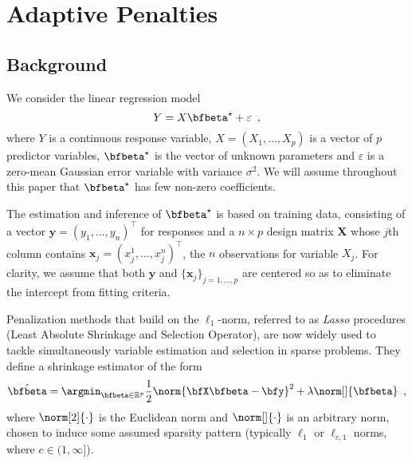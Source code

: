 \section{Adaptive Penalties \label{sec:adaptquadra}}

\subsection{Background}

We consider the linear regression model 
\begin{equation}
  \label{eq:linear_reg_group}
  Y = X \bfbeta^\star + \varepsilon
  \enspace,
\end{equation}
where $Y$ is a continuous response variable, $X=(X_1,\dots,X_p)$ is a vector of
$p$ predictor variables, $\bfbeta^\star$ is the vector of unknown parameters and
$\varepsilon$ is a zero-mean Gaussian error variable with variance $\sigma^2$.
We will assume throughout this paper that $\bfbeta^\star$ has few non-zero
coefficients.

The estimation and inference of $\bfbeta^\star$ is based on training data,
consisting of a vector
$\mathbf{y}=(y_1,\dots,y_n)^\intercal$ for responses and a
$n\times  p$ design  matrix $\mathbf{X}$  whose $j$th  column contains
$\mathbf{x}_j  = (x_j^1,\dots,x_j^n)^\intercal$, the  $n$ observations
for variable $X_j$.  For  clarity, we assume that both $\mathbf{y}$
and $\{\mathbf{x}_j\}_{j=1,\dots,p}$ are centered so as to eliminate the
intercept from fitting criteria.

Penalization methods that build on the $\ell_1$-norm, referred to as
\emph{Lasso} procedures (Least Absolute Shrinkage and Selection Operator), are
now widely used to tackle simultaneously variable estimation and selection in
sparse problems.  They define a shrinkage estimator of the form
\begin{equation}\label{eq:general:original}
  \hat{\bfbeta} = \argmin_{\bfbeta\in\mathbb{R}^p} 
    \frac{1}{2} \norm{\bfX \bfbeta - \bfy}^2 + 
    \lambda \norm[]{\bfbeta}
  \enspace, 
\end{equation}
where $\norm[2]{\cdot}$ is the Euclidean norm and $\norm[]{\cdot}$ is an
arbitrary norm, chosen to induce some assumed sparsity pattern (typically
$\ell_1$ or $\ell_{c,1}$ norms, where $c \in (1,\infty]$).
%


